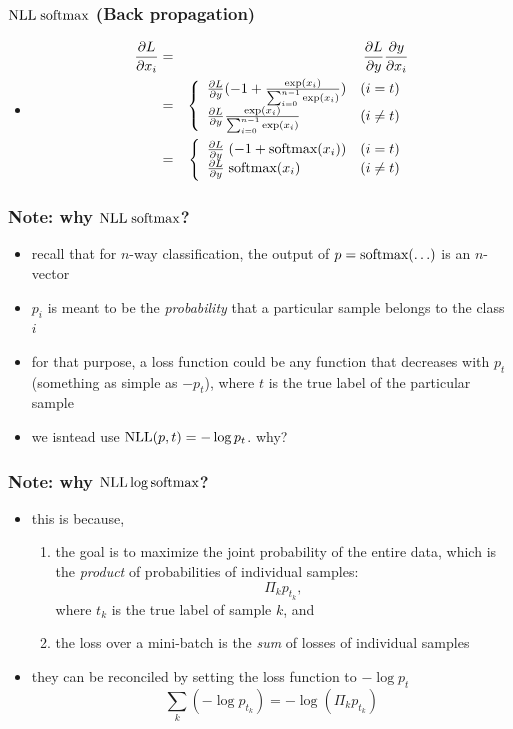 \documentclass[12pt,dvipdfmx]{beamer}
\begin{document}
\begin{frame}
  \frametitle{$\mbox{NLL}\; \mbox{softmax}$ (Back propagation)}
  \begin{itemize}
  \item 
\begin{eqnarray*}
  \frac{\partial L}{\partial x_i} & = & \frac{\partial L}{\partial y} \frac{\partial y}{\partial x_i} \\
              & = & \left\{\begin{array}{ll}
                             \frac{\partial L}{\partial y} (-1 + \frac{\exp(x_i)}{\sum_{i=0}^{n-1}\exp(x_i)}) & (i = t) \\
                             \frac{\partial L}{\partial y} \frac{\exp(x_i)}{\sum_{i=0}^{n-1}\exp(x_i)} & (i \neq t)
                          \end{array}\right. \\
              & = & \left\{\begin{array}{ll}
                            \frac{\partial L}{\partial y} \; (-1 + \mbox{softmax}(x_i)) & (i = t) \\
                            \frac{\partial L}{\partial y} \; \mbox{softmax}(x_i) & (i \neq t)
                          \end{array}\right.
\end{eqnarray*}
  \end{itemize}
\end{frame}

\begin{frame}
\frametitle{Note: why $\mbox{NLL}\; \mbox{softmax}$?}
\begin{itemize}
\item recall that for $n$-way classification,
  the output of $p = \mbox{softmax}(\ldots)$ is an $n$-vector 
\item $p_i$ is meant to be the {\it probability} that
  a particular sample belongs to the class $i$
\item for that purpose, a loss function could be
  any function that decreases with $p_t$
  (something as simple as $- p_t$),
  where $t$ is the true label of the particular sample
\item we isntead use $\mbox{NLL}(p, t) = -\log p_t$. why?
\end{itemize}
\end{frame}

\begin{frame}
\frametitle{Note: why $\mbox{NLL}\log\mbox{softmax}$?}
\begin{itemize}
\item this is because,
  \begin{enumerate}
  \item the goal is to maximize
    the joint probability of the entire data, which is
    the {\it product} of probabilities of individual samples:
    \[ \Pi_k p_{t_k}, \]
    where $t_k$ is the true label of sample $k$, and
  \item the loss over a mini-batch is
    the {\it sum} of losses of individual samples
  \end{enumerate}
\item they can be reconciled by setting the loss function
  to $-\log p_t$
  \[ \sum_k \left(-\log p_{t_k}\right) = - \log\left(\Pi_k p_{t_k}\right) \]
\end{itemize}
\end{frame}
\end{document}

